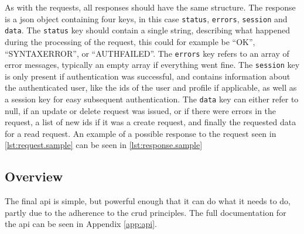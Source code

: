 As with the requests, all responses should have the same structure. The response is a \ac{json} object containing four keys, in this
case \lstinline|status|, \lstinline|errors|, \lstinline|session| and \lstinline|data|. The \lstinline|status| key should contain a single string, describing what happened during the
processing of the request, this could for example be ``OK'', ``SYNTAXERROR'', or ``AUTHFAILED''. The \lstinline|errors| key refers to an array of error
messages, typically an empty array if everything went fine. The \lstinline|session| key is only present if authentication was successful, and contains information
about the authenticated user, like the ids of the user and profile if applicable, as well as a session key for easy subsequent authentication.  The \lstinline|data| key
can either refer to null, if an update or delete request was issued, or if there were errors in the request, a list of new ids if it was a create request, and finally
the requested data for a read request. An example of a possible response to the request seen in \autoref{lst:request.sample} can be seen in \autoref{lst:response.sample}



\subsection{Overview}

The final \ac{api} is simple, but powerful enough that it can do what it needs to do, partly due to the adherence to the \ac{crud} principles. The full
documentation for the \ac{api} can be seen in Appendix \ref{app:api}.
